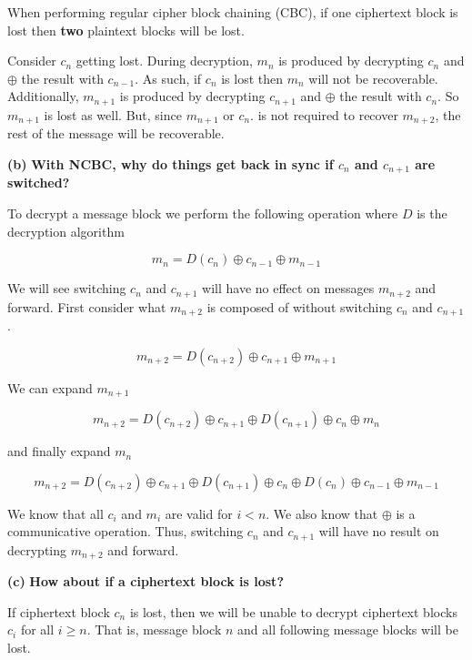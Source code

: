 \documentclass[11pt]{article}
\renewcommand\part[1]{\vspace{.10in}\textbf{(#1)}}
\begin{document}
When performing regular cipher block chaining (CBC), if one ciphertext block is lost then \textbf{two} plaintext blocks will be lost.

Consider $c_{n}$ getting lost. During decryption, $m_{n}$ is produced by decrypting $c_{n}$ and $\oplus$ the result with $c_{n-1}$. As such, if $c_{n}$ is lost then $m_{n}$ will not be recoverable. Additionally, $m_{n+1}$ is produced by decrypting $c_{n+1}$ and $\oplus$ the result with $c_{n}$. So $m_{n+1}$ is lost as well. But, since $m_{n+1}$ or $c_{n}$. is not required to recover $m_{n+2}$, the rest of the message will be recoverable.

\part{b} \textbf{With NCBC, why do things get back in sync if $c_n$ and $c_{n+1}$ are switched?} \newline

To decrypt a message block we perform the following operation where $D$ is the decryption algorithm

$$m_n = D(c_n) \oplus c_{n-1} \oplus m_{n - 1}$$

We will see switching $c_n$ and $c_{n+1}$ will have no effect on messages $m_{n+2}$ and forward. First consider what $m_{n+2}$ is composed of without switching $c_n$ and $c_{n+1}$.

$$m_{n+2} = D(c_{n+2}) \oplus c_{n + 1} \oplus m_{n + 1}$$

We can expand $m_{n + 1}$

$$m_{n+2} = D(c_{n+2}) \oplus c_{n + 1} \oplus D(c_{n+1}) \oplus c_{n} \oplus m_{n}$$

and finally expand $m_{n}$

$$m_{n+2} = D(c_{n+2}) \oplus c_{n + 1} \oplus D(c_{n+1}) \oplus c_{n} \oplus D(c_n) \oplus c_{n-1} \oplus m_{n-1}$$

We know that all $c_i$ and $m_i$ are valid for $i < n$. We also know that $\oplus$ is a communicative operation. Thus, switching $c_n$ and $c_{n+1}$ will have no result on decrypting $m_{n+2}$ and forward. 

\part{c} \textbf{How about if a ciphertext block is lost?} \newline

If ciphertext block $c_n$ is lost, then we will be unable to decrypt ciphertext blocks $c_i$ for all $i \geq n$. That is, message block $n$ and all following message blocks will be lost.
\end{document}
